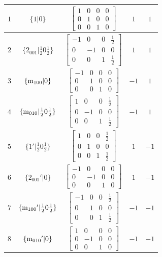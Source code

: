 \documentclass[fleqn,8pt]{jsarticle}
\begin{document}
\begin{longtable}{ccccc}
$ 1 $ & $ \{1|0\} $ & $ \begin{bmatrix} 1 & 0 & 0 & 0 \\ 0 & 1 & 0 & 0 \\ 0 & 0 & 1 & 0 \end{bmatrix} $ & $ 1 $ & $ 1 $ \\ \hline
$ 2 $ & $ \{2{}_{001}|\frac{1}{2} 0 \frac{1}{2}\} $ & $ \begin{bmatrix} -1 & 0 & 0 & \frac{1}{2} \\ 0 & -1 & 0 & 0 \\ 0 & 0 & 1 & \frac{1}{2} \end{bmatrix} $ & $ 1 $ & $ 1 $ \\ \hline
$ 3 $ & $ \{{\rm m}_{100}|0\} $ & $ \begin{bmatrix} -1 & 0 & 0 & 0 \\ 0 & 1 & 0 & 0 \\ 0 & 0 & 1 & 0 \end{bmatrix} $ & $ -1 $ & $ 1 $ \\ \hline
$ 4 $ & $ \{{\rm m}_{010}|\frac{1}{2} 0 \frac{1}{2}\} $ & $ \begin{bmatrix} 1 & 0 & 0 & \frac{1}{2} \\ 0 & -1 & 0 & 0 \\ 0 & 0 & 1 & \frac{1}{2} \end{bmatrix} $ & $ -1 $ & $ 1 $ \\ \hline
$ 5 $ & $ \{1{}'|\frac{1}{2} 0 \frac{1}{2}\} $ & $ \begin{bmatrix} 1 & 0 & 0 & \frac{1}{2} \\ 0 & 1 & 0 & 0 \\ 0 & 0 & 1 & \frac{1}{2} \end{bmatrix} $ & $ 1 $ & $ -1 $ \\ \hline
$ 6 $ & $ \{2{}_{001}{}'|0\} $ & $ \begin{bmatrix} -1 & 0 & 0 & 0 \\ 0 & -1 & 0 & 0 \\ 0 & 0 & 1 & 0 \end{bmatrix} $ & $ 1 $ & $ -1 $ \\ \hline
$ 7 $ & $ \{{\rm m}_{100}{}'|\frac{1}{2} 0 \frac{1}{2}\} $ & $ \begin{bmatrix} -1 & 0 & 0 & \frac{1}{2} \\ 0 & 1 & 0 & 0 \\ 0 & 0 & 1 & \frac{1}{2} \end{bmatrix} $ & $ -1 $ & $ -1 $ \\ \hline
$ 8 $ & $ \{{\rm m}_{010}{}'|0\} $ & $ \begin{bmatrix} 1 & 0 & 0 & 0 \\ 0 & -1 & 0 & 0 \\ 0 & 0 & 1 & 0 \end{bmatrix} $ & $ -1 $ & $ -1 $ \\
\end{longtable}
\end{document}
